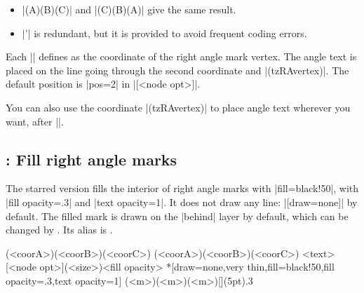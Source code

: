 \begin{tzcode}{.3}
\end{tzcode}

\remark 
\begin{itemize}\firmlist
\item |\tzrightanglemark(A)(B)(C)| and |\tzrightanglemark(C)(B)(A)| give the same result.
\item |\tzrightanglemark'| is redundant, but it is provided to avoid frequent coding errors.
\end{itemize} 

Each |\tzrightanglemark| defines  as the coordinate of the right angle mark vertex.
The angle text is placed on the line going through the second coordinate and |(tzRAvertex)|. The default position is |pos=2| in |[<node opt>]|.

\begin{tzcode}{.3}
{}
\end{tzcode}

\remark You can also use the coordinate |(tzRAvertex)| to place angle text wherever you want, after |\tzrightanglemark|.




\subsection{\protect\cmd{\tzrightanglemark*}: Fill right angle marks}
\label{ss:tzrightangle*}

The starred version \icmd{\tzrightanglemark*} fills the interior of right angle marks with |fill=black!50|, with |fill opacity=.3| and |text opacity=1|. It does not draw any line: |[draw=none]| by default. The filled mark is drawn on the |behind| layer by default, which can be changed by \icmd{\settzanglelayer}.
Its alias is \icmd{\settzanglemarklayer}.

\begin{tzdef}
\tzrightanglemark*(<coorA>)(<coorB>)(<coorC>)
\tzrightanglemark*[<opt>](<coorA>)(<coorB>)(<coorC>)
                  {<text>}[<node opt>](<size>){<fill opacity>}
 *[draw=none,very thin,fill=black!50,fill opacity=.3,text opacity=1]
  (<m>)(<m>)(<m>){}[](5pt){.3}
\end{tzdef}

